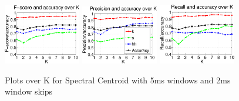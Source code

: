 \begin{figure}


	\centering\includegraphics[width=0.3\textwidth]{tex/appendices/test/scentroid52FP.png}
	\centering\includegraphics[width=0.3\textwidth]{tex/appendices/test/scentroid52_P.png}
	\centering\includegraphics[width=0.3\textwidth]{tex/appendices/test/scentroid52_R.png}
		
		\caption{Plots over K for Spectral Centroid with 5ms windows and 2ms window skips}
\end{figure}\clearpage

